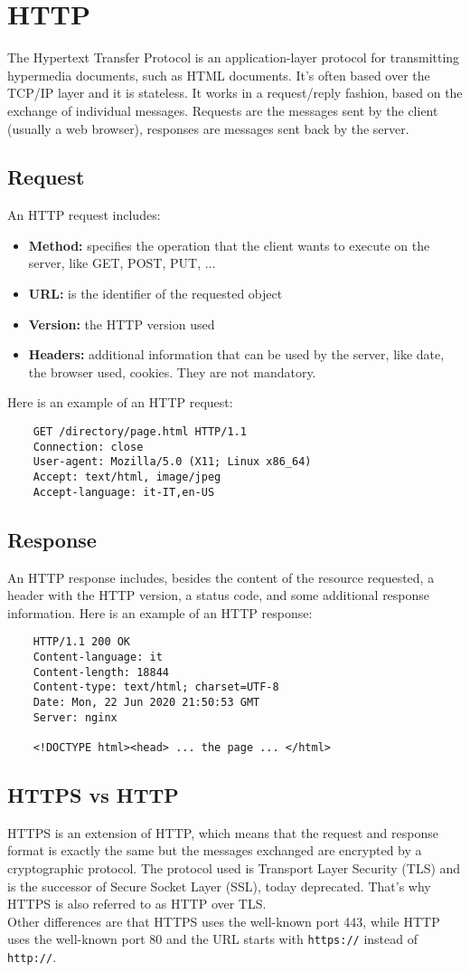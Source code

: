 \section{HTTP}
The Hypertext Transfer Protocol is an application-layer protocol for transmitting hypermedia documents, such as HTML documents. It's often based over the TCP/IP layer and it is stateless. It works in a request/reply fashion, based on the exchange of individual messages. Requests are the messages sent by the client (usually a web browser), responses are messages sent back by the server.
\subsection{Request}
An HTTP request includes:
\begin{itemize}
    \item{\textbf{Method:} specifies the operation that the client wants to execute on the server, like GET, POST, PUT, ...}
    \item{\textbf{URL:} is the identifier of the requested object}
    \item{\textbf{Version:} the HTTP version used}
    \item{\textbf{Headers:} additional information that can be used by the server, like date, the browser used, cookies. They are not mandatory.}
\end{itemize}
Here is an example of an HTTP request:
\begin{lstlisting}
    GET /directory/page.html HTTP/1.1
    Connection: close
    User-agent: Mozilla/5.0 (X11; Linux x86_64)
    Accept: text/html, image/jpeg
    Accept-language: it-IT,en-US
\end{lstlisting}

\subsection{Response}
An HTTP response includes, besides the content of the resource requested, a header with the HTTP version, a status code, and some additional response information.
Here is an example of an HTTP response:
\begin{lstlisting}
    HTTP/1.1 200 OK
    Content-language: it
    Content-length: 18844
    Content-type: text/html; charset=UTF-8
    Date: Mon, 22 Jun 2020 21:50:53 GMT
    Server: nginx

    <!DOCTYPE html><head> ... the page ... </html>
\end{lstlisting}
\subsection{HTTPS vs HTTP}
HTTPS is an extension of HTTP, which means that the request and response format is exactly the same but the messages exchanged are encrypted by a cryptographic protocol. The protocol used is Transport Layer Security (TLS) and is the successor of Secure Socket Layer (SSL), today deprecated. That's why HTTPS is also referred to as HTTP over TLS.\\
Other differences are that HTTPS uses the well-known port 443, while HTTP uses the well-known port 80 and the URL starts with \texttt{https://} instead of \texttt{http://}.
